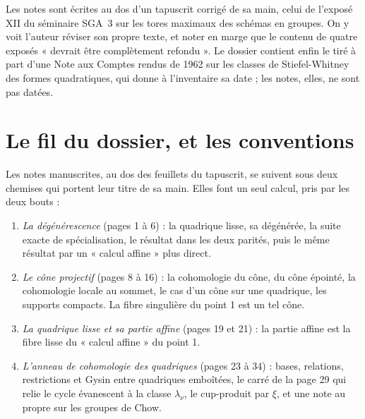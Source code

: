 \documentclass[11pt,a4paper]{article}
\begin{document}
\begin{resume}
Les notes sont écrites au dos d'un tapuscrit corrigé de sa main, celui de
l'exposé XII du séminaire SGA~3 sur les tores maximaux des schémas en
groupes. On y voit l'auteur réviser son propre texte, et noter en marge que
le contenu de quatre exposés « devrait être complètement refondu ». Le
dossier contient enfin le tiré à part d'une Note aux Comptes rendus de
1962 sur les classes de Stiefel-Whitney des formes quadratiques, qui donne
à l'inventaire sa date ; les notes, elles, ne sont pas datées.

\end{resume}

\section*{Le fil du dossier, et les conventions}

Les notes manuscrites, au dos des feuillets du tapuscrit, se suivent sous
deux chemises qui portent leur titre de sa main. Elles font un seul
calcul, pris par les deux bouts :

\begin{enumerate}
\item[1.] \emph{La dégénérescence} (pages 1 à 6) : la quadrique lisse, sa
dégénérée, la suite exacte de spécialisation, le résultat dans les deux
parités, puis le même résultat par un « calcul affine » plus direct.
\item[2.] \emph{Le cône projectif} (pages 8 à 16) : la cohomologie du cône,
du cône épointé, la cohomologie locale au sommet, le cas d'un cône sur une
quadrique, les supports compacts. La fibre singulière du point 1 est un tel
cône.
\item[3.] \emph{La quadrique lisse et sa partie affine} (pages 19 et 21) :
la partie affine est la fibre lisse du « calcul affine » du point 1.
\item[4.] \emph{L'anneau de cohomologie des quadriques} (pages 23 à 34) :
bases, relations, restrictions et Gysin entre quadriques emboîtées, le carré
de la page 29 qui relie le cycle évanescent à la classe $\lambda_{\nu}$, le
cup-produit par $\xi$, et une note au propre sur les groupes de Chow.
\end{enumerate}
\end{document}
